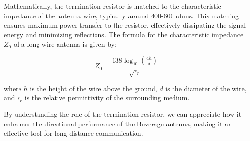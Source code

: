 Mathematically, the termination resistor is matched to the characteristic impedance of the antenna wire, typically around 400-600 ohms. This matching ensures maximum power transfer to the resistor, effectively dissipating the signal energy and minimizing reflections. The formula for the characteristic impedance \( Z_0 \) of a long-wire antenna is given by:

\[
Z_0 = \frac{138 \log_{10} \left( \frac{4h}{d} \right)}{\sqrt{\epsilon_r}}
\]

where \( h \) is the height of the wire above the ground, \( d \) is the diameter of the wire, and \( \epsilon_r \) is the relative permittivity of the surrounding medium.

By understanding the role of the termination resistor, we can appreciate how it enhances the directional performance of the Beverage antenna, making it an effective tool for long-distance communication.

